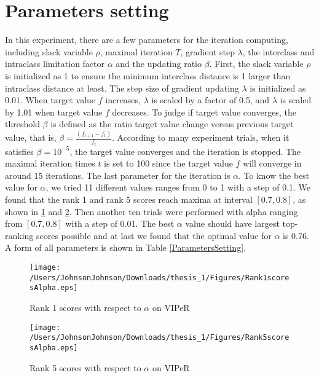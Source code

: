 \section{Parameters setting}
In this experiment, there are a few parameters for the iteration computing, including slack variable $\rho$, maximal iteration $T$, gradient step $\lambda$, the interclass and intraclass limitation factor $\alpha$ and the updating ratio $\beta$. First, the slack variable $\rho$ is initialized as 1 to ensure the minimum interclass distance is 1 larger than intraclass distance at least. The step size of gradient updating $\lambda$ is initialized as 0.01. When target value $f$ increases,  $\lambda$ is scaled by a factor of 0.5, and  $\lambda$ is scaled by 1.01 when target value $f$ decreases. To judge if target value converges, the threshold $\beta$ is defined as the ratio target value change versus previous target value, that is, $\beta = \frac{(f_{t+1}-f_t)}{f_t}$. According to many experiment trials, when it satisfies $\beta = 10^{-5}$, the target value converges and the iteration is stopped. The maximal iteration times $t$ is set to 100 since the target value $f$ will converge in around 15 iterations.  The last parameter for the iteration is $\alpha$. To know the best value for $\alpha$, we tried 11 different values ranges from 0 to 1 with a step of 0.1. We found that the rank 1 and rank 5 scores reach maxima at interval $[0.7,0.8]$, as shown in \ref{Rank1curve} and \ref{Rank5curve}. Then another ten trials were performed with alpha ranging from $[0.7,0.8]$ with a step of 0.01. The best $\alpha$ value should have largest top-ranking scores possible and at last we found that the optimal value for $\alpha$ is 0.76. A form of all parameters is shown in Table \ref{ParametersSetting}.
\begin{figure}[H]
\begin{raggedleft}
\texttt{[image: /Users/JohnsonJohnson/Downloads/thesis\_1/Figures/Rank1scoresAlpha.eps]}
\vspace{-3em}
\caption{Rank 1 scores with respect to $\alpha$ on VIPeR}
\label{Rank1curve}
\end{raggedleft}
\end{figure}
\begin{figure}[H]
\begin{raggedleft}
\texttt{[image: /Users/JohnsonJohnson/Downloads/thesis\_1/Figures/Rank5scoresAlpha.eps]}
\vspace{-3em}
\caption{Rank 5 scores with respect to $\alpha$ on VIPeR}
\label{Rank5curve}
\end{raggedleft}
\end{figure}

